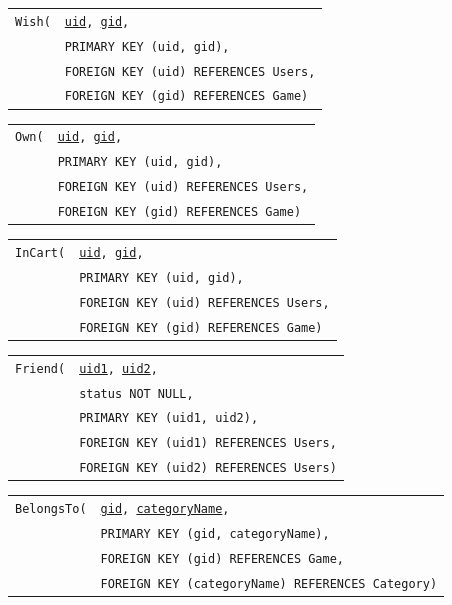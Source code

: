 \documentclass[12pt, oneside]{article}
\begin{document}
\begin{tabular}{l@{}l}
    \texttt{Wish(} & \texttt{\underline{uid}, \underline{gid},}\\
                    & \texttt{PRIMARY KEY (uid, gid),}\\
                    & \texttt{FOREIGN KEY (uid) REFERENCES Users,}\\
                    & \texttt{FOREIGN KEY (gid) REFERENCES Game)}
\end{tabular}

\begin{tabular}{l@{}l}
    \texttt{Own(} & \texttt{\underline{uid}, \underline{gid},}\\
                   & \texttt{PRIMARY KEY (uid, gid),}\\
                   & \texttt{FOREIGN KEY (uid) REFERENCES Users,}\\
                   & \texttt{FOREIGN KEY (gid) REFERENCES Game)}
\end{tabular}

\begin{tabular}{l@{}l}
    \texttt{InCart(} & \texttt{\underline{uid}, \underline{gid},}\\
                      & \texttt{PRIMARY KEY (uid, gid),}\\
                      & \texttt{FOREIGN KEY (uid) REFERENCES Users,}\\
                      & \texttt{FOREIGN KEY (gid) REFERENCES Game)}
\end{tabular}

\begin{tabular}{l@{}l}
    \texttt{Friend(} & \texttt{\underline{uid1}, \underline{uid2},}\\
                      & \texttt{status NOT NULL,}\\
                      & \texttt{PRIMARY KEY (uid1, uid2),}\\
                      & \texttt{FOREIGN KEY (uid1) REFERENCES Users,}\\
                      & \texttt{FOREIGN KEY (uid2) REFERENCES Users)}
\end{tabular}

\begin{tabular}{l@{}l}
    \texttt{BelongsTo(} & \texttt{\underline{gid}, \underline{categoryName},}\\
                          & \texttt{PRIMARY KEY (gid, categoryName),}\\
                          & \texttt{FOREIGN KEY (gid) REFERENCES Game,}\\
                          & \texttt{FOREIGN KEY (categoryName) REFERENCES Category)}
\end{tabular}
\end{document}
